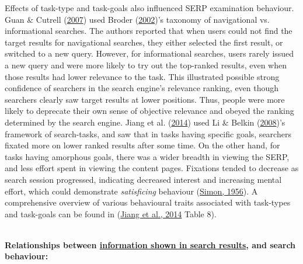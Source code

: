 \documentclass[a4paper, nobind]{templates/ociamthesis}
\begin{document}
Effects of task-type and task-goals also influenced SERP examination
behaviour. Guan \& Cutrell (\protect\hyperlink{ref-105}{2007}) used Broder (\protect\hyperlink{ref-broder2002taxonomy}{2002})'s taxonomy of navigational vs.
informational searches. The authors reported that when users could not
find the target results for navigational searches, they either selected
the first result, or switched to a new query. However, for informational
searches, users rarely issued a new query and were more likely to try
out the top-ranked results, even when those results had lower relevance
to the task. This illustrated possible strong confidence of searchers in
the search engine's relevance ranking, even though searchers clearly saw
target results at lower positions. Thus, people were more likely to
deprecate their own sense of objective relevance and obeyed the ranking
determined by the search engine. Jiang et al. (\protect\hyperlink{ref-126}{2014}) used Li \& Belkin (\protect\hyperlink{ref-li2008faceted}{2008})'s framework of
search-tasks, and saw that in tasks having specific goals, searchers
fixated more on lower ranked results after some time. On the other hand,
for tasks having amorphous goals, there was a wider breadth in viewing
the SERP, and less effort spent in viewing the content pages. Fixations
tended to decrease as search session progressed, indicating decreased
interest and increasing mental effort, which could demonstrate
\emph{satisficing} behaviour (\protect\hyperlink{ref-simon1956rational}{Simon, 1956}). A comprehensive overview
of various behavioural traits associated with task-types and task-goals
can be found in (\protect\hyperlink{ref-126}{Jiang et al., 2014} Table 8).

~\\
\textbf{Relationships between \uline{information shown in search
results}, and search behaviour:}
\end{document}
